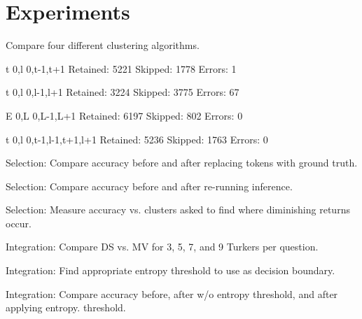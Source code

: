 \section{Experiments}

Compare four different clustering algorithms.

t 0,l 0,t-1,t+1 Retained: 5221 Skipped: 1778 Errors: 1

t 0,l 0,l-1,l+1 Retained: 3224 Skipped: 3775 Errors: 67

E 0,L 0,L-1,L+1 Retained: 6197 Skipped: 802 Errors: 0

t 0,l 0,t-1,l-1,t+1,l+1 Retained: 5236 Skipped: 1763 Errors: 0 \newline

\noindent Selection: Compare accuracy before and after replacing tokens with ground truth. \newline

\noindent Selection: Compare accuracy before and after re-running inference. \newline

\noindent Selection: Measure accuracy vs. clusters asked to find where diminishing returns occur. \newline

\noindent Integration: Compare DS vs. MV for 3, 5, 7, and 9 Turkers per question. \newline

\noindent Integration: Find appropriate entropy threshold to use as decision boundary. \newline

\noindent Integration: Compare accuracy before, after w/o entropy threshold, and after applying entropy. threshold.

